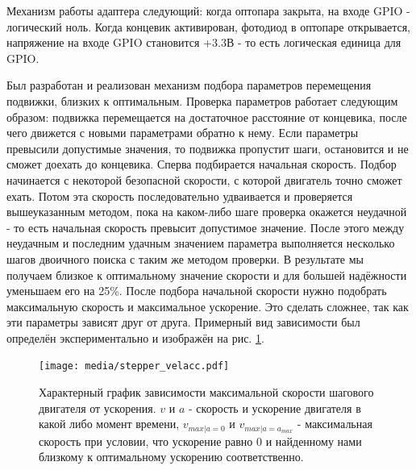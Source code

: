 \documentclass[14pt,russian,a4paper]{extarticle}
\newcounter{subsubsubsection}[subsubsection]
\begin{document}
Механизм работы адаптера следующий: когда оптопара закрыта, на входе GPIO - логический ноль. Когда концевик активирован, фотодиод в оптопаре открывается, напряжение на входе GPIO становится +3.3В - то есть логическая единица для GPIO.

Был разработан и реализован механизм подбора параметров перемещения подвижки, близких к оптимальным. Проверка параметров работает следующим образом: подвижка перемещается на достаточное расстояние от концевика, после чего движется с новыми параметрами обратно к нему. Если параметры превысили допустимые значения, то подвижка пропустит шаги, остановится и не сможет доехать до концевика. Сперва подбирается начальная скорость. Подбор начинается с некоторой безопасной скорости, с которой двигатель точно сможет ехать. Потом эта скорость последовательно удваивается и проверяется вышеуказанным методом, пока на каком-либо шаге проверка окажется неудачной - то есть начальная скорость превысит допустимое значение. После этого между неудачным и последним удачным значением параметра выполняется несколько шагов двоичного поиска с таким же методом проверки. В результате мы получаем близкое к оптимальному значение скорости и для большей надёжности уменьшаем его на 25\%. После подбора начальной скорости нужно подобрать максимальную скорость и максимальное ускорение. Это сделать сложнее, так как эти параметры зависят друг от друга. Примерный вид зависимости был определён экспериментально и изображён на рис. \ref{fig:stepper_velacc}.
\newline

\begin{figure}[h!]
    \centerline{\texttt{[image: media/stepper\_velacc.pdf]}}
    \caption{Характерный график зависимости максимальной скорости шагового двигателя от ускорения. $v$ и $a$ - скорость и ускорение двигателя в какой либо момент времени, $v_{max | a=0}$ и $v_{max | a=a_{max}}$ - максимальная скорость при условии, что ускорение равно 0 и найденному нами близкому к оптимальному ускорению соответственно.}
    \label{fig:stepper_velacc}
\end{figure}
\end{document}
